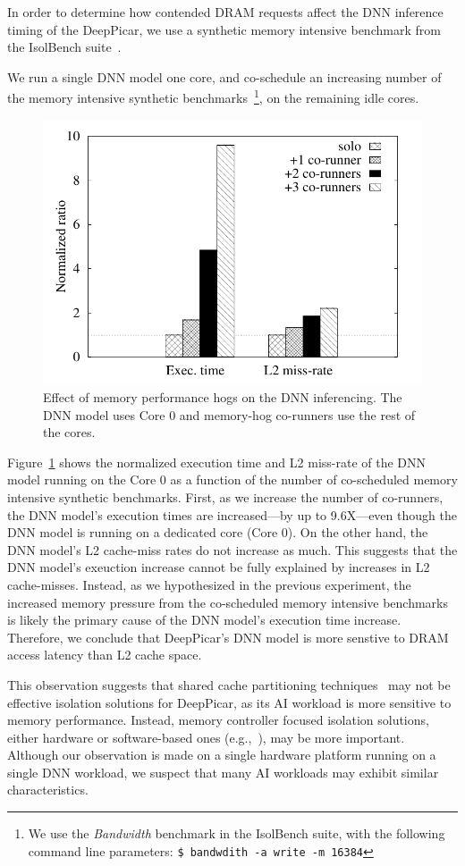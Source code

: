 In order to determine how contended DRAM requests affect the DNN
inference timing of the DeepPicar, we use a synthetic memory
intensive benchmark from the IsolBench suite~\cite{Valsan2016}.

We run a single DNN model one core, and
co-schedule an increasing number of the memory intensive synthetic
benchmarks~\footnote{We use the \emph{Bandwidth} benchmark in the
  IsolBench suite, with the following command line parameters: \texttt{\$
  bandwdith -a write -m 16384}}, on the remaining idle cores.

\begin{figure}[h]
  \centering
  \includegraphics[width=.45\textwidth]{figs/perf_vs_bandwidth}
  \caption{Effect of memory performance hogs on the DNN
    inferencing. The DNN model uses Core 0 and memory-hog co-runners
    use the rest of the cores.}
  \label{fig:}
\end{figure}

Figure~\ref{fig:} shows the normalized execution time and L2 miss-rate
of the DNN model running on the Core 0 as a function of the number of
co-scheduled memory intensive synthetic benchmarks. First, as we
increase the number of co-runners, the DNN model's execution times are
increased---by up to 9.6X---even though the DNN model is running on a
dedicated core (Core 0). On the other hand, the DNN model's L2
cache-miss rates do not increase as much. This suggests that
the DNN model's exeuction increase cannot be fully explained by
increases in L2 cache-misses. Instead, as we hypothesized in the previous
experiment, the increased memory pressure from the co-scheduled memory
intensive benchmarks is likely the primary cause of the DNN model's execution
time increase. Therefore, we conclude that DeepPicar's DNN model is
more senstive to DRAM access latency than L2 cache space.

This observation suggests that shared cache partitioning
techniques~\cite{Gracioli2015,Kim2016} may not be effective isolation
solutions for DeepPicar, as its AI workload is more sensitive to memory
performance. Instead, memory controller focused isolation solutions,
either hardware or software-based ones (e.g.,~\cite{Guo2017,Yun2013}),
may be more important. Although our observation is made on a single
hardware platform running on a single DNN workload, we suspect that
many AI workloads may exhibit similar characteristics.

